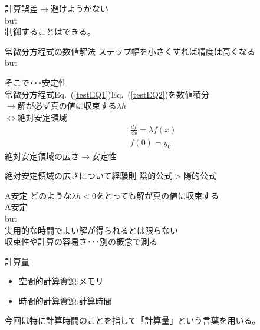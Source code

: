 \documentclass[unicode, 12pt, aspectratio=169]{beamer}
\newcommand{\eref}[1]{Eq.~(\ref{#1})}
\begin{document}
\begin{frame}
    計算誤差$\rightarrow$避けようがない\\
    \alert{but}\\
    制御することはできる。
    \begin{block}{常微分方程式の数値解法}
      ステップ幅を小さくすれば精度は高くなる\\
      \alert{but}
    \end{block}
    そこで･･･\alert{安定性}\\
    常微分方程式\eref{testEQ1}\eref{testEQ2}を数値積分\\
    $\rightarrow$解が必ず真の値に収束する$\lambda h$\\
    $\iff$絶対安定領域
    \begin{align}
      \frac{df}{dx}= \lambda f(x)\label{testEQ1}\\
      f(0) = y_0\label{testEQ2}
    \end{align}
    絶対安定領域の広さ$\rightarrow$安定性
\end{frame}

\begin{frame}
  \begin{block}{絶対安定領域の広さについて経験則}
    \alert{陰的公式$>$陽的公式}
  \end{block}

  \begin{block}{A安定}
    どのような$\lambda h<0$をとっても解が真の値に収束する\\
    A安定\\
    \alert{but}\\
    実用的な時間でよい解が得られるとは限らない\\
    収束性や計算の容易さ･･･別の概念で測る
  \end{block}
\end{frame}

\begin{frame}
    計算量
    \begin{itemize}
      \item 空間的計算資源:メモリ
      \item 時間的計算資源:計算時間
    \end{itemize}
    今回は特に計算時間のことを指して「計算量」という言葉を用いる。
\end{frame}
\end{document}
